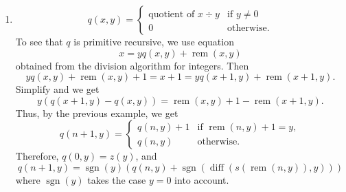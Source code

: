 \documentclass[12pt]{article}
\begin{document}
\begin{enumerate}
\begin{displaymath}
\begin{array}{ll}
0 & \textrm{if } \operatorname{diff}(s(n\!\!\!\!\mod\! y),y)=0, \\
s(n\!\!\!\!\mod\! y) & \textrm{otherwise,}
\end{array}
\right.
\end{displaymath}
Then $\operatorname{rem}(0,y)=z(y)$, and 
\begin{eqnarray*}
\operatorname{rem}(n+1,y) &=& \operatorname{sgn}(y) (\operatorname{rem}(n,y)+1)\operatorname{sgn}(|\operatorname{rem}(n,y)+1 - y|) \\ &=& \operatorname{mult}(\operatorname{sgn}(y),\operatorname{mult}(s(\operatorname{rem}(n,y)),\operatorname{sgn}(\operatorname{diff}(s(\operatorname{rem}(n,y)),y)))) \\
&=& g(y,\operatorname{rem}(n,y))
\end{eqnarray*}
where $g(y,x):=\operatorname{mult}(\operatorname{sgn}(y),\operatorname{mult}(s(x),\operatorname{sgn}(\operatorname{diff}(s(x),y))))$.  The reason for including $\operatorname{sgn}(y)$ is to account for the case when $y=0$.
\item 
\begin{displaymath}
q(x,y)= \left\{
\begin{array}{ll}
\textrm{quotient of }x\div y & \textrm{if } y \ne 0 \\
0 & \textrm{otherwise.}
\end{array}
\right.
\end{displaymath}
To see that $q$ is primitive recursive, we use equation $$x=yq(x,y)+\operatorname{rem}(x,y)$$ obtained from the division algorithm for integers.  Then $$yq(x,y)+\operatorname{rem}(x,y)+1 = x+1 = yq(x+1,y)+\operatorname{rem}(x+1,y).$$  Simplify and we get $$y(q(x+1,y)-q(x,y))=\operatorname{rem}(x,y)+1 -\operatorname{rem}(x+1,y).$$
Thus, by the previous example, we get
\begin{displaymath}
q(n+1,y)= \left\{
\begin{array}{ll}
q(n,y)+1 & \textrm{if } \operatorname{rem}(n,y)+1 = y, \\
q(n,y) & \textrm{otherwise.}
\end{array}
\right.
\end{displaymath}
Therefore, $q(0,y)=z(y)$, and $$q(n+1,y)=\operatorname{sgn}(y)(q(n,y)+\operatorname{sgn}(\operatorname{diff}(s(\operatorname{rem}(n,y)),y)))$$
where $\operatorname{sgn}(y)$ takes the case $y=0$ into account.
\end{enumerate}
\end{document}
